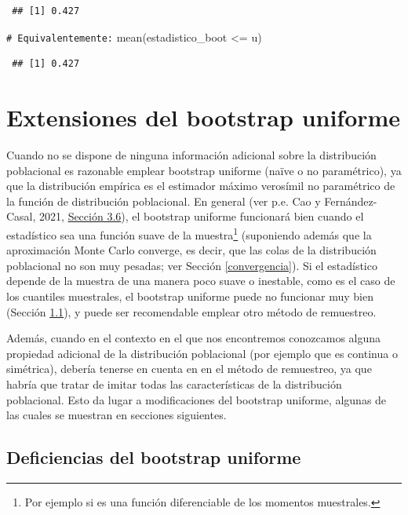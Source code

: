 \documentclass[
]{book}
\newenvironment{Shaded}{\begin{snugshade}}{\end{snugshade}}
\newcommand{\CommentTok}[1]{\textcolor[rgb]{0.56,0.35,0.01}{\textit{#1}}}
\newcommand{\FunctionTok}[1]{\textcolor[rgb]{0.00,0.00,0.00}{#1}}
\newcommand{\NormalTok}[1]{#1}
\newcommand{\SpecialCharTok}[1]{\textcolor[rgb]{0.00,0.00,0.00}{#1}}
\theoremstyle{break}
\theoremstyle{nonumberplain}
\renewcommand{\CommentTok}[1]{\textcolor[rgb]{0.41,0.41,0.41}{\texttt{#1}}}
\begin{document}
\begin{verbatim}
 ## [1] 0.427
\end{verbatim}

\begin{Shaded}
\begin{Highlighting}[]
\CommentTok{\# Equivalentemente:}
\FunctionTok{mean}\NormalTok{(estadistico\_boot }\SpecialCharTok{\textless{}=}\NormalTok{ u)}
\end{Highlighting}
\end{Shaded}

\begin{verbatim}
 ## [1] 0.427
\end{verbatim}

\hypertarget{modunif}{%
\chapter{Extensiones del bootstrap uniforme}\label{modunif}}

Cuando no se dispone de ninguna información adicional sobre la distribución poblacional es razonable emplear bootstrap uniforme (naïve o no paramétrico), ya que la distribución empírica es el estimador máximo verosímil no paramétrico de la función de distribución poblacional.
En general (ver p.e. Cao y Fernández-Casal, 2021, \href{https://rubenfcasal.github.io/book_remuestreo/validez-de-la-aproximaci\%C3\%B3n-bootstrap.html}{Sección 3.6}), el bootstrap uniforme funcionará bien cuando el estadístico sea una función suave de la muestra\footnote{Por ejemplo si es una función diferenciable de los momentos muestrales.} (suponiendo además que la aproximación Monte Carlo converge, es decir, que las colas de la distribución poblacional no son muy pesadas; ver Sección \ref{convergencia}).
Si el estadístico depende de la muestra de una manera poco suave o inestable, como es el caso de los cuantiles muestrales, el bootstrap uniforme puede no funcionar muy bien (Sección \ref{deficien-unif}), y puede ser recomendable emplear otro método de remuestreo.

Además, cuando en el contexto en el que nos encontremos conozcamos alguna propiedad adicional de la distribución poblacional (por ejemplo que es continua o simétrica), debería tenerse en cuenta en en el método de remuestreo, ya que habría que tratar de imitar todas las características de la distribución poblacional.
Esto da lugar a modificaciones del bootstrap uniforme, algunas de las cuales se muestran en secciones siguientes.

\hypertarget{deficien-unif}{%
\section{Deficiencias del bootstrap uniforme}\label{deficien-unif}}
\end{document}
